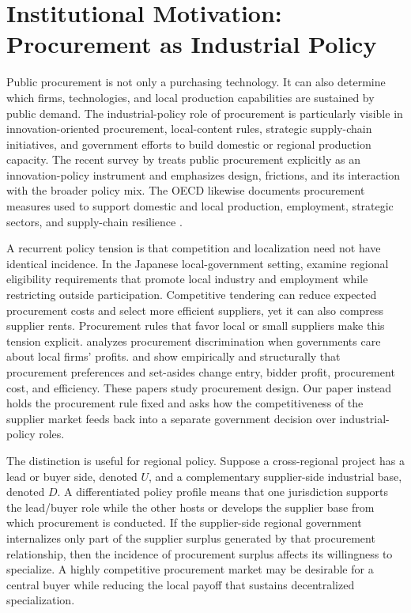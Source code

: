 \section{Institutional Motivation: Procurement as Industrial Policy}
\label{sec:institutional}

Public procurement is not only a purchasing technology. It can also determine which firms, technologies, and local production capabilities are sustained by public demand. The industrial-policy role of procurement is particularly visible in innovation-oriented procurement, local-content rules, strategic supply-chain initiatives, and government efforts to build domestic or regional production capacity. The recent survey by \citet{ChiappinelliGiuffridaSpagnolo2025} treats public procurement explicitly as an innovation-policy instrument and emphasizes design, frictions, and its interaction with the broader policy mix. The OECD likewise documents procurement measures used to support domestic and local production, employment, strategic sectors, and supply-chain resilience \citep{OECD2026}.

A recurrent policy tension is that competition and localization need not have identical incidence. In the Japanese local-government setting, \citet{SaitoMitsuta2012} examine regional eligibility requirements that promote local industry and employment while restricting outside participation. Competitive tendering can reduce expected procurement costs and select more efficient suppliers, yet it can also compress supplier rents. Procurement rules that favor local or small suppliers make this tension explicit. \citet{Vagstad1995} analyzes procurement discrimination when governments care about local firms' profits. \citet{Marion2007} and \citet{AtheyCoeyLevin2013} show empirically and structurally that procurement preferences and set-asides change entry, bidder profit, procurement cost, and efficiency. These papers study procurement design. Our paper instead holds the procurement rule fixed and asks how the competitiveness of the supplier market feeds back into a separate government decision over industrial-policy roles.

The distinction is useful for regional policy. Suppose a cross-regional project has a lead or buyer side, denoted $U$, and a complementary supplier-side industrial base, denoted $D$. A differentiated policy profile means that one jurisdiction supports the lead/buyer role while the other hosts or develops the supplier base from which procurement is conducted. If the supplier-side regional government internalizes only part of the supplier surplus generated by that procurement relationship, then the incidence of procurement surplus affects its willingness to specialize. A highly competitive procurement market may be desirable for a central buyer while reducing the local payoff that sustains decentralized specialization.

